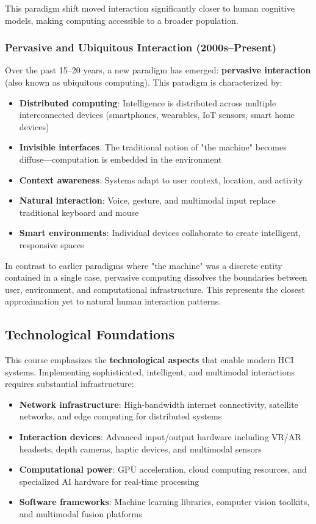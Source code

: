 \documentclass[11pt,a4paper]{article}
\theoremstyle{definition}
\theoremstyle{plain}
\theoremstyle{remark}
\begin{document}
This paradigm shift moved interaction significantly closer to human cognitive models, making computing accessible to a broader population.

\subsubsection{Pervasive and Ubiquitous Interaction (2000s–Present)}

Over the past 15–20 years, a new paradigm has emerged: \textbf{pervasive interaction} (also known as ubiquitous computing). This paradigm is characterized by:

\begin{itemize}
    \item \textbf{Distributed computing}: Intelligence is distributed across multiple interconnected devices (smartphones, wearables, IoT sensors, smart home devices)
    \item \textbf{Invisible interfaces}: The traditional notion of "the machine" becomes diffuse—computation is embedded in the environment
    \item \textbf{Context awareness}: Systems adapt to user context, location, and activity
    \item \textbf{Natural interaction}: Voice, gesture, and multimodal input replace traditional keyboard and mouse
    \item \textbf{Smart environments}: Individual devices collaborate to create intelligent, responsive spaces
\end{itemize}

In contrast to earlier paradigms where "the machine" was a discrete entity contained in a single case, pervasive computing dissolves the boundaries between user, environment, and computational infrastructure. This represents the closest approximation yet to natural human interaction patterns.

\subsection{Technological Foundations}

This course emphasizes the \textbf{technological aspects} that enable modern HCI systems. Implementing sophisticated, intelligent, and multimodal interactions requires substantial infrastructure:

\begin{itemize}
    \item \textbf{Network infrastructure}: High-bandwidth internet connectivity, satellite networks, and edge computing for distributed systems
    \item \textbf{Interaction devices}: Advanced input/output hardware including VR/AR headsets, depth cameras, haptic devices, and multimodal sensors
    \item \textbf{Computational power}: GPU acceleration, cloud computing resources, and specialized AI hardware for real-time processing
    \item \textbf{Software frameworks}: Machine learning libraries, computer vision toolkits, and multimodal fusion platforms
\end{itemize}
\end{document}

